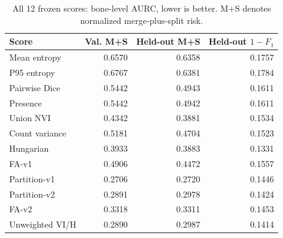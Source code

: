 \begin{table}[t]
\caption{All 12 frozen scores: bone-level AURC, lower is better. M+S denotes normalized merge-plus-split risk.}
\label{tab:main}
\centering\footnotesize
\begin{tabular}{lrrr}
\hline
Score & Val. M+S & Held-out M+S & Held-out $1-F_1$ \\
\hline
Mean entropy & 0.6570 & 0.6358 & 0.1757 \\
P95 entropy & 0.6767 & 0.6381 & 0.1784 \\
Pairwise Dice & 0.5442 & 0.4943 & 0.1611 \\
Presence & 0.5442 & 0.4942 & 0.1611 \\
Union NVI & 0.4342 & 0.3881 & 0.1534 \\
Count variance & 0.5181 & 0.4704 & 0.1523 \\
Hungarian & 0.3933 & 0.3883 & 0.1331 \\
FA-v1 & 0.4906 & 0.4472 & 0.1557 \\
Partition-v1 & 0.2706 & 0.2720 & 0.1446 \\
Partition-v2 & 0.2891 & 0.2978 & 0.1424 \\
FA-v2 & 0.3318 & 0.3311 & 0.1453 \\
Unweighted VI/H & 0.2890 & 0.2987 & 0.1414 \\
\hline
\end{tabular}
\end{table}
